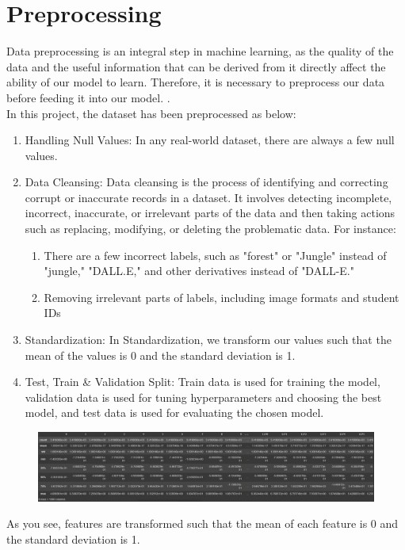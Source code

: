 \documentclass{template}
\begin{document}
\section{Preprocessing}
Data preprocessing is an integral step in machine learning, as the quality of the data and the useful information that can be derived from it directly affect the ability of our model to learn. Therefore, it is necessary to preprocess our data before feeding it into our model.
\newpage
.\\
In this project, the dataset has been preprocessed as below:
\begin{enumerate}[label=\roman*.]
  \item Handling Null Values: In any real-world dataset, there are always a few null values.
  \item Data Cleansing: Data cleansing is the process of identifying and correcting corrupt or inaccurate records in a dataset. It involves detecting incomplete, incorrect, inaccurate, or irrelevant parts of the data and then taking actions such as replacing, modifying, or deleting the problematic data. For instance:
  \begin{enumerate}[label=\alph*.]
    \item There are a few incorrect labels, such as "forest" or "Jungle" instead of "jungle," "DALL.E," and other derivatives instead of "DALL-E."
    \item Removing irrelevant parts of labels, including image 
    formats and student IDs
  \end{enumerate}
  \item Standardization: In Standardization, we transform our values such that the mean of the values is 0 and the standard deviation is 1.
  \item Test, Train {\&}  Validation Split: Train data is used for training the model, validation data is used for tuning hyperparameters and choosing the best model, and test data is used for evaluating the chosen model.
\end{enumerate}
\begin{figure}
\includegraphics[scale=0.33]{preprocessing.jpg}
\caption{}
\label{fig:logo}
\end{figure}
As you see, features are transformed such that the mean of each feature is 0 and the standard deviation is 1.\\\\
\end{document}
